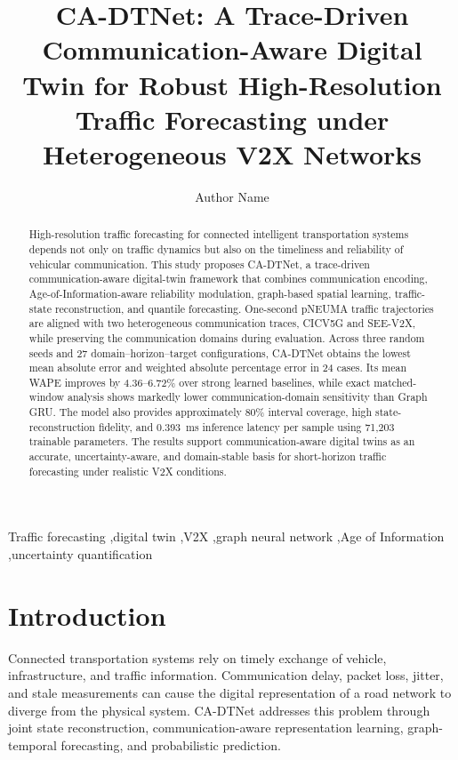 \documentclass[preprint,12pt]{elsarticle}
\begin{document}
\begin{frontmatter}
\title{CA-DTNet: A Trace-Driven Communication-Aware Digital Twin for Robust High-Resolution Traffic Forecasting under Heterogeneous V2X Networks}
\author[aff1]{Author Name}
\address[aff1]{Department, Institution, City, Country}

\begin{abstract}
High-resolution traffic forecasting for connected intelligent transportation
systems depends not only on traffic dynamics but also on the timeliness and
reliability of vehicular communication. This study proposes CA-DTNet, a
trace-driven communication-aware digital-twin framework that combines
communication encoding, Age-of-Information-aware reliability modulation,
graph-based spatial learning, traffic-state reconstruction, and quantile
forecasting. One-second pNEUMA traffic trajectories are aligned with two
heterogeneous communication traces, CICV5G and SEE-V2X, while preserving the
communication domains during evaluation. Across three random seeds and 27
domain--horizon--target configurations, CA-DTNet obtains the lowest mean
absolute error and weighted absolute percentage error in 24 cases. Its mean
WAPE improves by 4.36--6.72\% over strong learned baselines, while exact
matched-window analysis shows markedly lower communication-domain sensitivity
than Graph GRU. The model also provides approximately 80\% interval coverage,
high state-reconstruction fidelity, and 0.393~ms inference latency per sample
using 71,203 trainable parameters. The results support communication-aware
digital twins as an accurate, uncertainty-aware, and domain-stable basis for
short-horizon traffic forecasting under realistic V2X conditions.
\end{abstract}

\begin{keyword}
Traffic forecasting \sep digital twin \sep V2X \sep graph neural network \sep Age of Information \sep uncertainty quantification
\end{keyword}
\end{frontmatter}

\section{Introduction}
Connected transportation systems rely on timely exchange of vehicle,
infrastructure, and traffic information. Communication delay, packet loss,
jitter, and stale measurements can cause the digital representation of a road
network to diverge from the physical system. CA-DTNet addresses this problem
through joint state reconstruction, communication-aware representation
learning, graph-temporal forecasting, and probabilistic prediction.
\end{document}
